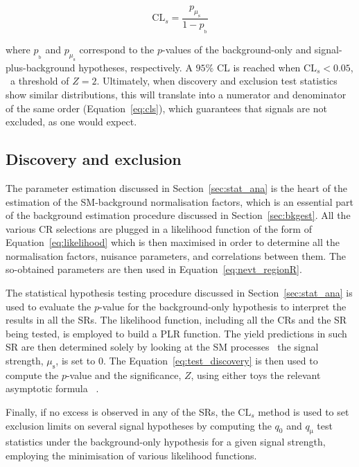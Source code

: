 			\begin{equation}
				\mathrm{CL}_s = \frac{p_{\mu_{\mathrm{s}}}} {1 - p_{_\mathrm{b}}}
			\label{eq:cls}
			\end{equation}

			\noindent where $p_{_\mathrm{b}}$ and $p_{\mu_{\mathrm{s}}}$ correspond to the $p$-values of the background-only and signal-plus-background hypotheses, respectively. A $95\%$ \ac{CL} is reached when $\mathrm{CL}_s < 0.05$, \ie\ a threshold of $Z = 2$. Ultimately, when discovery and exclusion test statistics show similar distributions, this will translate into a numerator and denominator of the same order (Equation~\ref{eq:cls}), which guarantees that signals are not excluded, as one would expect.


			\subsection{Discovery and exclusion}

				The parameter estimation discussed in Section~\ref{sec:stat_ana} is the heart of the estimation of the \ac{SM}-background normalisation factors, which is an essential part of the background estimation procedure discussed in Section~\ref{sec:bkgest}. All the various \ac{CR} selections are plugged in a likelihood function of the form of Equation~\ref{eq:likelihood} which is then maximised in order to determine all the normalisation factors, nuisance parameters, and correlations between them. The so-obtained parameters are then used in Equation~\ref{eq:nevt_regionR}. 

				The statistical hypothesis testing procedure discussed in Section~\ref{sec:stat_ana} is used to evaluate the $p$-value for the background-only hypothesis to interpret the results in all the \acp{SR}. The likelihood function, including all the \acp{CR} and the \ac{SR} being tested, is employed to build a \ac{PLR} function. The yield predictions in such \ac{SR} are then determined solely by looking at the \ac{SM} processes \ie\ the signal strength, $\mu_{\mathrm{s}}$, is set to $0$. The Equation~\ref{eq:test_discovery} is then used to compute the $p$-value and the significance, $Z$, using either toys the relevant asymptotic formula ~\cite{Cowan2011}.

				Finally, if no excess is observed in any of the \acp{SR}, the $\mathrm{CL}_s$ method is used to set exclusion limits on several signal hypotheses by computing the $q_0$ and $q_{\mathrm{\mu}}$ test statistics under the background-only hypothesis for a given signal strength, employing the minimisation of various likelihood functions. %



